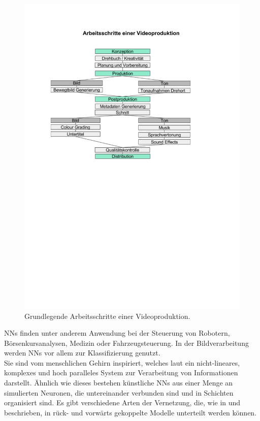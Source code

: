 \documentclass[times, 11pt,twocolumn]{article}
\begin{document}
\begin{figure}
	\flushleft
	\includegraphics[width=\columnwidth, trim = 20mm 145mm 45mm 40mm, clip]{Bilder/ArbeitsschritteVideoproduktion.pdf}
	\caption{Grundlegende Arbeitsschritte einer Videoproduktion.}
	\label{fig:Videoproduktion}
\end{figure}
 \label{sec:NeuronaleNetze}

NNs finden unter anderem Anwendung bei der Steuerung von Robotern, Börsenkursanalysen, Medizin oder Fahrzeugsteuerung. In der Bildverarbeitung werden NNs vor allem zur Klassifizierung genutzt. \\
Sie sind vom menschlichen Gehirn inspiriert, welches laut \cite{NNHaykin} ein nicht-lineares, komplexes und hoch paralleles System zur Verarbeitung von Informationen darstellt. Ähnlich wie dieses bestehen künstliche NNs aus einer Menge an simulierten Neuronen, die untereinander verbunden sind und in Schichten organisiert sind. Es gibt verschiedene Arten der Vernetzung, die, wie in \cite{NNHaykin} und \cite{NNStanley} beschrieben, in rück- und vorwärts gekoppelte Modelle unterteilt werden können.\\
\end{document}
